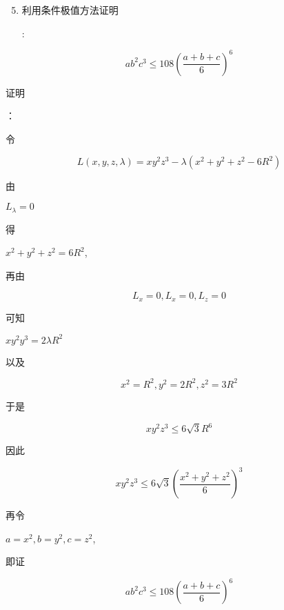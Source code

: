 \documentclass[10pt]{article}
\begin{document}
\begin{enumerate}
  \setcounter{enumi}{4}
  \item \begin{CJK}{UTF8}{mj}利用条件极值方法证明\end{CJK}:
\end{enumerate}
$$
a b^{2} c^{3} \leqslant 108\left(\frac{a+b+c}{6}\right)^{6}
$$
\begin{CJK}{UTF8}{mj}证明\end{CJK}：\begin{CJK}{UTF8}{mj}令\end{CJK}
$$
L(x, y, z, \lambda)=x y^{2} z^{3}-\lambda\left(x^{2}+y^{2}+z^{2}-6 R^{2}\right)
$$
\begin{CJK}{UTF8}{mj}由\end{CJK} $L_{\lambda}=0$ \begin{CJK}{UTF8}{mj}得\end{CJK} $x^{2}+y^{2}+z^{2}=6 R^{2}$, \begin{CJK}{UTF8}{mj}再由\end{CJK}
$$
L_{x}=0, L_{x}=0, L_{z}=0
$$
\begin{CJK}{UTF8}{mj}可知\end{CJK} $x y^{2} y^{3}=2 \lambda R^{2}$ \begin{CJK}{UTF8}{mj}以及\end{CJK}
$$
x^{2}=R^{2}, y^{2}=2 R^{2}, z^{2}=3 R^{2}
$$
\begin{CJK}{UTF8}{mj}于是\end{CJK}
$$
x y^{2} z^{3} \leqslant 6 \sqrt{3} R^{6}
$$
\begin{CJK}{UTF8}{mj}因此\end{CJK}
$$
x y^{2} z^{3} \leqslant 6 \sqrt{3}\left(\frac{x^{2}+y^{2}+z^{2}}{6}\right)^{3}
$$
\begin{CJK}{UTF8}{mj}再令\end{CJK} $a=x^{2}, b=y^{2}, c=z^{2}$, \begin{CJK}{UTF8}{mj}即证\end{CJK}
$$
a b^{2} c^{3} \leqslant 108\left(\frac{a+b+c}{6}\right)^{6}
$$
\end{document}
